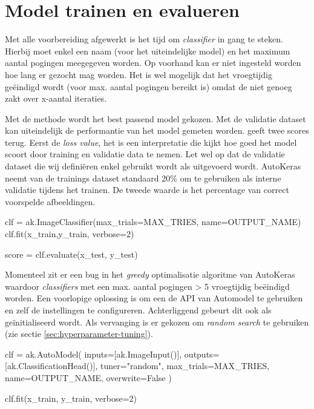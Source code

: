 \section{Model trainen en evalueren}
\label{sec:traineval-autokeras}

Met alle voorbereiding afgewerkt is het tijd om \textit{classifier} in gang te steken. Hierbij moet enkel een naam (voor het uiteindelijke model) en het maximum aantal pogingen meegegeven worden. Op voorhand kan er niet ingesteld worden hoe lang er gezocht mag worden. Het is wel mogelijk dat het vroegtijdig geëindigd wordt (voor max. aantal pogingen bereikt is) omdat de  niet genoeg zakt over x-aantal iteraties.

Met de  methode wordt het best passend model gekozen. Met de validatie dataset kan uiteindelijk de performantie van het model gemeten worden.  geeft twee scores terug. Eerst de \textit{loss value}, het is een interpretatie die kijkt hoe goed het model scoort door training en validatie data te nemen. Let wel op dat de validatie dataset die wij definiëren enkel gebruikt wordt als  uitgevoerd wordt. AutoKeras neemt van de trainings dataset standaard 20\% om te gebruiken als interne validatie tijdens het trainen. De tweede waarde is het percentage van correct voorspelde afbeeldingen.

\bigskip

\begin{python}
clf = ak.ImageClassifier(max_trials=MAX_TRIES, name=OUTPUT_NAME)
clf.fit(x_train,y_train, verbose=2)

score = clf.evaluate(x_test, y_test)
\end{python}

Momenteel zit er een bug in het \textit{greedy} optimalisatie algoritme van AutoKeras waardoor \textit{classifiers} met een max. aantal pogingen > 5 vroegtijdig beëindigd worden. Een voorlopige oplossing is om een de API van Automodel te gebruiken en zelf de instellingen te configureren. Achterliggend gebeurt dit ook als  geïnitialiseerd wordt. Als vervanging is er gekozen om \textit{random search} te gebruiken (zie sectie \ref{sec:hyperparameter-tuning}).

\bigskip

\begin{python}
clf = ak.AutoModel(
    inputs=[ak.ImageInput()], 
    outputs=[ak.ClassificationHead()], 
    tuner="random",
    max_trials=MAX_TRIES, 
    name=OUTPUT_NAME,
    overwrite=False
    )
    
clf.fit(x_train, y_train, verbose=2)
\end{python}

